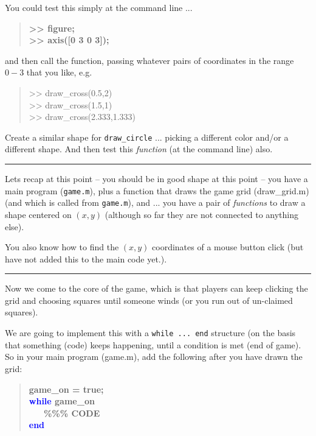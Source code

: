 \documentclass{tufte-book} %
\newenvironment{docspec}{\begin{quotation}\ttfamily\parskip0pt\parindent0pt\ignorespaces}{\end{quotation}}
\newenvironment{docspecbold}{\begin{quotation}\ttfamily\bfseries\parskip0pt\parindent0pt\ignorespaces}{\end{quotation}}
\begin{document}
You could test this simply at the command line ...
\begin{docspecbold}
>> figure;\\
>> axis([0 3 0 3]);
\end{docspecbold}
and then call the function, passing whatever pairs of coordinates in the range \(0-3\) that you like, e.g.
\begin{docspec}
>> draw\_cross(0.5,2)\\
>> draw\_cross(1.5,1)\\
>> draw\_cross(2.333,1.333)
\end{docspec}

Create a similar shape for \texttt{draw\_circle} ...  picking a different color and/or a different shape. And then test this \textit{function} (at the command line) also.

\vspace{1mm}
\noindent\rule{4cm}{0.5pt}
\vspace{2mm}

\noindent Lets recap at this point -- you should be in good shape at this point -- you have a main program (\texttt{game.m}), plus a function that draws the game grid (\textsf{draw\_grid.m}) (and which is called from \texttt{game.m}), and ...  you have a pair of \textit{functions} to draw a shape centered on \((x,y)\) (although so far they are not connected to anything else).

You also know how to find the \((x,y)\) coordinates of a mouse button click (but have not added this to the main code yet.). 

\vspace{1mm}
\noindent\rule{4cm}{0.5pt}
\vspace{2mm}

\noindent Now we come to the core of the game, which is that players can keep clicking the grid and choosing squares until someone winds (or you run out of un-claimed squares).

We are going to implement this with a \texttt{while ... end} structure (on the basis that something (code) keeps happening, until a condition is met (end of game). So in your main program (game.m), add the following after you have drawn the grid:
\vspace{-1mm}
\begin{docspecbold}
game\_on = true;\\
\textcolor{blue}{while} game\_on\\
\ \ \    \textcolor[rgb]{0,0.501961,0}{\%\%\% CODE} \\   
\textcolor{blue}{end}
\end{docspecbold}
\vspace{-1mm}
\end{document}

